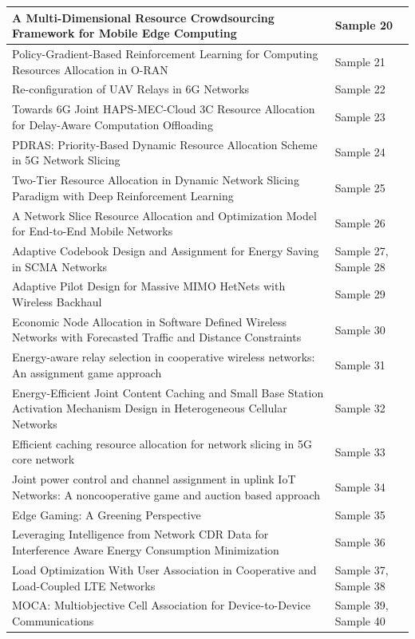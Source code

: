 \documentclass[11pt]{article}
\begin{document}
\begin{table}[htbp]
{\begin{tabular}{|>{\raggedright\arraybackslash}m{13cm}|>{\raggedright\arraybackslash}m{3.5cm}|}
\hline
A Multi-Dimensional Resource Crowdsourcing
Framework for Mobile Edge Computing  & Sample 20\\
\hline
Policy-Gradient-Based Reinforcement Learning for
Computing Resources Allocation in O-RAN  & Sample 21\\
\hline
Re-configuration of UAV Relays in 6G Networks  & Sample 22\\
\hline
Towards 6G Joint HAPS-MEC-Cloud 3C Resource Allocation for Delay-Aware Computation Offloading  & Sample 23\\
\hline
PDRAS: Priority‑Based Dynamic Resource Allocation
Scheme in 5G Network Slicing  & Sample 24\\
\hline
Two-Tier Resource Allocation in Dynamic Network
Slicing Paradigm with Deep Reinforcement
Learning  & Sample 25\\
\hline
A Network Slice Resource Allocation and
Optimization Model for End-to-End Mobile Networks  & Sample 26\\
\hline
Adaptive Codebook Design and Assignment for
Energy Saving in SCMA Networks  & Sample 27, Sample 28\\
\hline
Adaptive Pilot Design for Massive MIMO HetNets
with Wireless Backhaul  & Sample 29\\
\hline
Economic Node Allocation in Software Defined
Wireless Networks with Forecasted Traffic and
Distance Constraints  & Sample 30\\
\hline
Energy-aware relay selection in cooperative wireless networks: An
assignment game approach  & Sample 31\\
\hline
Energy-Efficient Joint Content Caching and Small
Base Station Activation Mechanism Design in Heterogeneous Cellular Networks  & Sample 32\\
\hline
Efficient caching resource allocation for
network slicing in 5G core network  & Sample 33\\
\hline
Joint power control and channel assignment in uplink IoT Networks: A noncooperative game and auction based approach  & Sample 34\\
\hline
Edge Gaming: A Greening Perspective  & Sample 35\\
\hline
Leveraging Intelligence from Network CDR
Data for Interference Aware Energy
Consumption Minimization  & Sample 36\\
\hline
Load Optimization With User Association
in Cooperative and Load-Coupled
LTE Networks  & Sample 37, Sample 38\\
\hline
MOCA: Multiobjective Cell Association for Device-to-Device Communications  & Sample 39, Sample 40\\

\end{tabular}}
\end{table}
\end{document}
